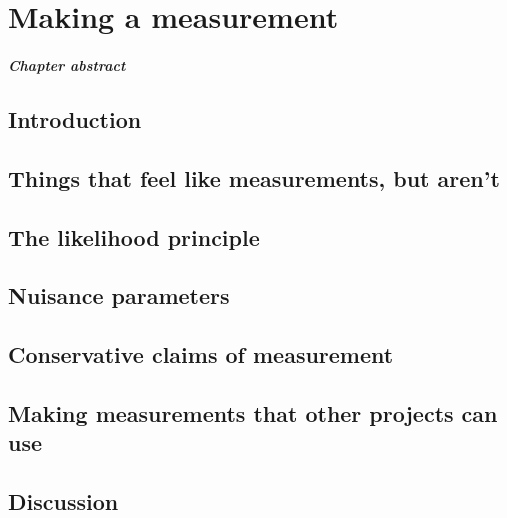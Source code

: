 
\chapter{Making a measurement}\label{ch:measurement}
\paragraph{Chapter abstract}

\section{Introduction}

\section{Things that feel like measurements, but aren't}

\section{The likelihood principle}

\section{Nuisance parameters}

\section{Conservative claims of measurement}

\section{Making measurements that other projects can use}

\section{Discussion}
